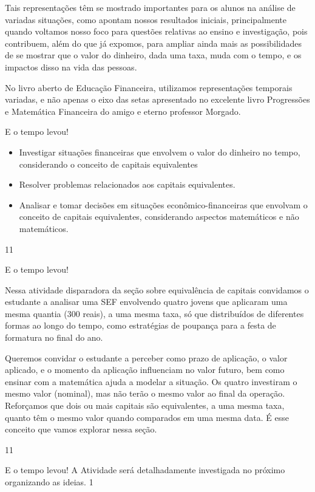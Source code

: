 \begin{paginatexto}
Tais representações têm se mostrado importantes para os alunos na análise de variadas situações, como apontam nossos resultados iniciais, principalmente quando voltamos nosso foco para questões relativas ao ensino e investigação, pois contribuem, além do que já expomos, para ampliar ainda mais as possibilidades de se mostrar que o valor do dinheiro, dada uma taxa, muda com o tempo, e os impactos disso na vida das pessoas.

No livro aberto de Educação Financeira, utilizamos representações temporais variadas, e não apenas o eixo das setas apresentado no excelente livro Progressões e Matemática Financeira do amigo e eterno professor Morgado.
\end{paginatexto}
\clearpage

\def\currentcolor{session1}
\begin{objectives}{E o tempo levou!}
{
\begin{itemize}
\item Investigar situações financeiras que envolvem o valor do dinheiro no tempo, considerando o conceito de capitais equivalentes 
\item Resolver problemas relacionados aos capitais equivalentes.
\item Analisar e tomar decisões em situações econômico-financeiras que envolvam o conceito de capitais equivalentes, considerando aspectos matemáticos e não matemáticos.
\end{itemize}
}{1}{1}
\end{objectives}
\begin{sugestions}{E o tempo levou!}
{
Nessa atividade disparadora da seção sobre equivalência de capitais convidamos o estudante a analisar uma SEF envolvendo quatro jovens que aplicaram uma mesma quantia (300 reais), a uma mesma taxa, só que distribuídos de diferentes formas ao longo do tempo, como estratégias de poupança para a festa de formatura no final do ano. 

Queremos convidar o estudante a perceber como prazo de aplicação, o valor aplicado, e o momento da aplicação influenciam no valor futuro, bem como ensinar com a matemática ajuda a modelar a situação. Os quatro investiram o mesmo valor (nominal), mas não terão o mesmo valor ao final da operação.
Reforçamos que dois ou mais capitais são equivalentes, a uma mesma taxa, quanto têm o mesmo valor quando comparados em uma mesma data. É esse conceito que vamos explorar nessa seção.

}{1}{1}
\end{sugestions}
\begin{answer}{E o tempo levou!}
{
A Atividade será detalhadamente investigada no próximo organizando as ideias.
}{1}
\end{answer}
\label{fin-exp-4}

